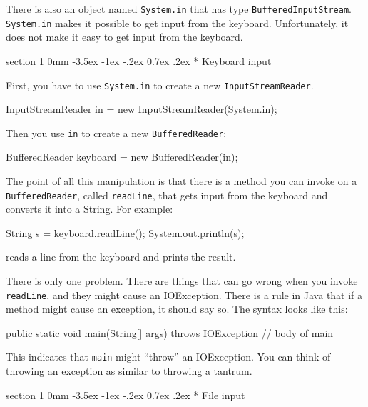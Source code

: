 \documentclass{book}
\makeatletter
\renewcommand{\section}{\@startsection 
    {section} {1} {0mm}%
    {-3.5ex \@plus -1ex \@minus -.2ex}%
    {0.7ex \@plus.2ex}%
    {\normalfont\Large\bfseries}}
\makeatother
\begin{document}
There is also an object named {\tt System.in} that has
type {\tt BufferedInputStream}.  {\tt System.in} makes it
possible to get input from the keyboard.  Unfortunately,
it does not make it easy to get input from the keyboard.


\section* {Keyboard input}
\label{keyboard}

First, you have to use {\tt System.in} to create a new
{\tt InputStreamReader}.

\begin{verbatimtab}
    InputStreamReader in = new InputStreamReader(System.in);
\end{verbatimtab}
%
Then you use {\tt in} to create a new {\tt BufferedReader}:

\begin{verbatimtab}
    BufferedReader keyboard = new BufferedReader(in);
\end{verbatimtab}
%
The point of all this manipulation is that there is a method
you can invoke on a {\tt BufferedReader}, called {\tt readLine},
that gets input from the keyboard and converts it into a
String.  For example:

\begin{verbatimtab}
    String s = keyboard.readLine();
    System.out.println(s);
\end{verbatimtab}
%
reads a line from the keyboard and prints the result.

There is only one problem.  There are things that can go wrong
when you invoke {\tt readLine}, and they might cause an
IOException.  There is a rule in Java that if a method might
cause an exception, it should say so.  The syntax looks
like this:

\begin {verbatimtab}
public static void main(String[] args) throws IOException {
    // body of main
}
\end{verbatimtab}

This indicates that {\tt main} might ``throw'' an IOException.
You can think of throwing an exception as similar to throwing
a tantrum.


\section* {File input}
\label{fileIO}
\end{document}

